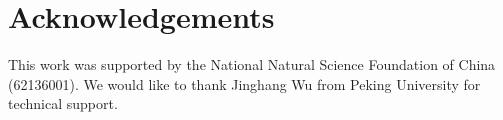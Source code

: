 \section*{Acknowledgements}
\label{sec:ack}
% 
\begin{sloppypar}
This work was supported by the National Natural Science Foundation of China (62136001). We would like to thank Jinghang Wu from Peking University for technical support.
\end{sloppypar}